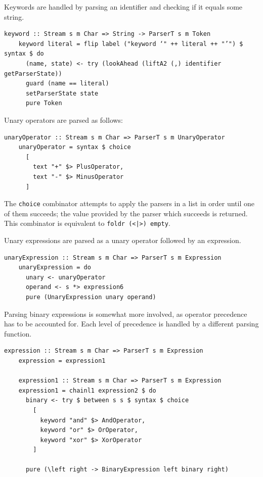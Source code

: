 \documentclass[UdineBachThesis,american,11pt]{PhdThesis}
\begin{document}
  Keywords are handled by parsing an identifier and checking if it equals some
  string.

  \begin{Verbatim}[gobble=4,fontsize=\small]
    keyword :: Stream s m Char => String -> ParserT s m Token
    keyword literal = flip label ("keyword ‘" ++ literal ++ "’") $ syntax $ do
      (name, state) <- try (lookAhead (liftA2 (,) identifier getParserState))
      guard (name == literal)
      setParserState state
      pure Token
  \end{Verbatim}

  Unary operators are parsed as follows:

  \begin{Verbatim}[gobble=4,fontsize=\small]
    unaryOperator :: Stream s m Char => ParserT s m UnaryOperator
    unaryOperator = syntax $ choice
      [
        text "+" $> PlusOperator,
        text "-" $> MinusOperator
      ]
  \end{Verbatim}

  The \mbox{\texttt{choice}} combinator attempts to apply the parsers in a list
  in order until one of them succeeds; the value provided by the parser which
  succeeds is returned. This combinator is equivalent to
  \mbox{\texttt{foldr (<|>) empty}}.

  Unary expressions are parsed as a unary operator followed by an expression.

  \begin{Verbatim}[gobble=4,fontsize=\small]
    unaryExpression :: Stream s m Char => ParserT s m Expression
    unaryExpression = do
      unary <- unaryOperator
      operand <- s *> expression6
      pure (UnaryExpression unary operand)
  \end{Verbatim}

  Parsing binary expressions is somewhat more involved, as operator precedence
  has to be accounted for. Each level of precedence is handled by a different
  parsing function.

  \begin{Verbatim}[gobble=4,fontsize=\small]
    expression :: Stream s m Char => ParserT s m Expression
    expression = expression1

    expression1 :: Stream s m Char => ParserT s m Expression
    expression1 = chainl1 expression2 $ do
      binary <- try $ between s s $ syntax $ choice
        [
          keyword "and" $> AndOperator,
          keyword "or" $> OrOperator,
          keyword "xor" $> XorOperator
        ]

      pure (\left right -> BinaryExpression left binary right)
  \end{Verbatim}
\end{document}
